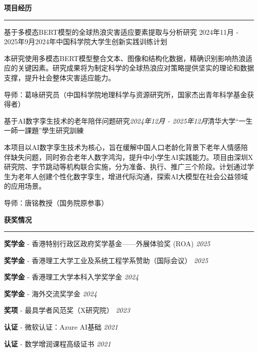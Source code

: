 \documentclass[UTF8, 10pt, fontset=adobe]{ctexart}
\renewenvironment{rSection}[1]{
\sectionskip
\textcolor{TsinghuaPurple}{\textbf{#1}}
\sectionlineskip
\hrule
\begin{list}{}{
\setlength{\leftmargin}{0em}
}
\item[]
}{
\end{list}
}
\begin{document}

\begin{rSection}{项目经历}

\begin{rSubsection}{基于多模态BERT模型的全球热浪灾害适应要素提取与分析研究} {2024年11月 - 2025年9月}{2024年中国科学院大学生创新实践训练计划}{}

\item 本研究使用多模态BERT模型整合文本、图像和结构化数据，精确识别影响热浪适应的关键因素。研究成果将为制定科学的全球热浪应对策略提供坚实的理论和数据支撑，提升社会整体灾害适应能力。
\item 导师：葛咏研究员（中国科学院地理科学与资源研究所，国家杰出青年科学基金获得者）

\end{rSubsection}  


\begin{rSubsection}{基于AI数字孪生技术的老年陪伴问题研究}{\textit{2024年12月 - 2025年12月}}{清华大学“一生一師一課題”學生研究訓練}{} 
\item 本项目以AI数字孪生技术为核心，旨在缓解中国人口老龄化背景下老年人情感陪伴缺失问题，同时弥合老年人数字鸿沟，提升中小学生AI实践能力。项目由深圳X研究院、字节跳动等机构联合实施，分为准备、执行、推广三个阶段。计划通过学生为老年人创建个性化数字孪生，增进代际沟通，探索AI大模型在社会公益领域的应用场景。
\item 导师：唐铭教授（国务院原参事）
\end{rSubsection}

\end{rSection}


\begin{rSection}{获奖情况}
{\textbf{奖学金} - 香港特别行政区政府奖学基金——外展体验奖 (ROA)} \hfill \textit{2025}

{\textbf{奖学金} - 香港理工大学工业及系统工程学系赞助（国际会议）} \hfill \textit{2025}

{\textbf{奖学金} - 香港理工大学本科入学奖学金} \hfill \textit{2024}

{\textbf{奖学金} - 海外交流奖学金} \hfill \textit{2024}

{\textbf{奖项} - 最具学者风范奖（X研究院）} \hfill \textit{2023}

{\textbf{认证} - 微软认证：Azure AI基础} \hfill \textit{2021}

{\textbf{认证} - 数学增润课程高级证书} \hfill \textit{2021}
\end{rSection}
\end{document}
